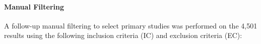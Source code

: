 
\paragraph{Manual Filtering}

A follow-up manual filtering to select primary studies was performed on the 4,501 results using the following inclusion criteria (IC) and exclusion criteria (EC):

